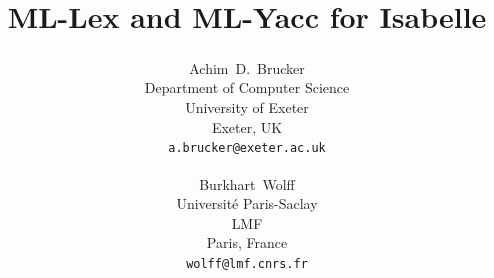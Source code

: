 \documentclass[abstract=on,fontsize=10pt,a5paper,mpinclude=true,
oneside,
pagesize,DIV=14]{scrartcl}
\title{ML-Lex and ML-Yacc for Isabelle}
\author{
\begin{minipage}{0.11\textwidth}\end{minipage}\begin{minipage}{0.4\textwidth}\centering
Achim~D.~Brucker\textsuperscript{\orcidlink{0000-0002-6355-1200}}\\\small
Department of Computer Science\\
University of Exeter\\
Exeter, UK\\
\texttt{a.brucker@exeter.ac.uk}
\end{minipage}\and\begin{minipage}{0.4\textwidth}\centering
Burkhart~Wolff\textsuperscript{\orcidlink{0000-0002-9648-7663}}\\\small
Université Paris-Saclay\\
LMF\\
Paris, France\\
\texttt{wolff@lmf.cnrs.fr}
\end{minipage}
}
\date{}
\begin{document}
\renewcommand{\sectionautorefname}{Section}
\renewcommand{\subsectionautorefname}{Section}
\renewcommand{\subsubsectionautorefname}{Section}



\printbibliography
\end{document}
